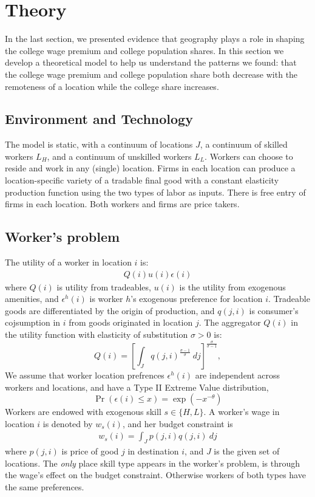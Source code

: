 \documentclass{article}
\begin{document}
\section{Theory}

In the last section, we presented evidence that geography plays a role in shaping the college wage premium and college population shares.  In this section we develop a theoretical model to help us understand the patterns we found: that the college wage premium and college population share both decrease with the remoteness of a location while the college share increases.

\subsection{Environment and Technology}

The model is static, with a continuum of locations $J$, a continuum of skilled workers $L_H$, and a continuum of unskilled workers $L_L$.  Workers can choose to reside and work in any (single) location.  Firms in each location can produce a location-specific variety of a tradable final good with a constant elasticity production function using the two types of labor as inputs.  There is free entry of firms in each location.  Both workers and firms are price takers.

\subsection{Worker's problem}

The utility of a worker in location $i$ is:
\begin{eqnarray}\label{eq:utility}
	Q(i) u(i) \epsilon(i)
\end{eqnarray} 
where $Q(i)$ is utility from tradeables, $u(i)$ is the utility from exogenous amenities, and $\epsilon^h(i)$ is worker $h$'s exogenous preference for location $i$.  Tradeable goods are differentiated by the origin of production, and $q(j,i)$ is consumer's cojsumption in $i$ from goods originated in location $j$. The aggregator $Q(i)$ in the utility function with elasticity of substitution $\sigma>0$ is:
\[
	Q(i) = \left[\int_J q(j,i)^{\frac{ \sigma - 1}{\sigma}}~ dj\right]^{\frac{\sigma}{\sigma-1}},
\]
We assume that worker location prefrences $\epsilon^h(i)$ are independent across workers and locations, and have a Type II Extreme Value distribution,
\[
    \Pr(\epsilon(i) \leq x) = \exp(-x^{-\theta})
\]
Workers are endowed with exogenous skill $s \in \{H,L\}$. A worker's wage in location $i$ is denoted by $w_s(i)$, and her budget constraint is 
\begin{eqnarray}\label{eq:budget}
	w_s(i) = \int_J p(j,i)q(j,i)~dj 
\end{eqnarray}
where $p(j,i)$ is price of good $j$ in destination $i$, and $J$ is the given set of locations.  The \emph{only} place skill type appears in the worker's problem, is through the wage's effect on the budget constraint.  Otherwise workers of both types have the same preferences.
\end{document}

